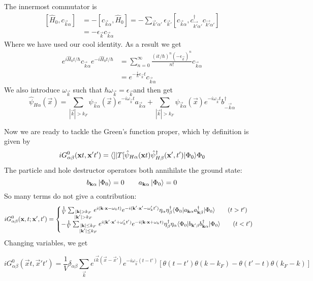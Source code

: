 The innermost commutator is
\begin{align*}
\left[\hat{H}_0, c_{\vec{k}\alpha}\right] &= -\left[c_{\vec{k}\alpha}, \hat{H}_0\right] = -\sum_{\vec{k}'\alpha'}\epsilon_{\vec{k}'}\left[c_{\vec{k}\alpha}, c^\dagger_{\vec{k'}\alpha'}c_{\vec{k'}\alpha'} \right] \\
&= -\epsilon_{\vec{k}}c_{\vec{k}\alpha}
\end{align*}
Where we have used our cool identity. As a result we get 
\begin{align*}
e^{i\hat{H}_0t / \hbar}c_{\vec{k}\alpha}e^{-i\hat{H}_0t / \hbar} &= \sum^\infty_{n=0}\frac{(it/\hbar)^n(-\epsilon_{\vec{k}})^n}{n!}c_{\vec{k}\alpha} \\
&= e^{- \frac{i}{\hbar}\epsilon_{\vec{k}}t}c_{\vec{k}\alpha}
\end{align*}
We also introduce $\omega_{\vec{k}}$ such that $\hbar \omega_{\vec{k}} = \epsilon_{\vec{k}}$and then get
\[ \hat{\psi}_{H\alpha}(\vec{x}) = \sum_{|\vec{k}|>k_F}\psi_{\vec{k}\alpha}(\vec{x})e^{-i\omega_{\vec{k}}t}a_{\vec{k}\alpha} + \sum_{|\vec{k}|> k_F}\psi_{\vec{k}\alpha}(\vec{x})e^{-i\omega_{\vec{k}}t}b^\dagger_{-\vec{k}\alpha} \]

Now we are ready to tackle the Green's function proper, which by definition is given by 
\[ iG_{\alpha\beta}^0(\vec{x}t, \vec{x}'t') = \braket[T[\hat{\psi}_{H\alpha}(\vec{x}t)\hat{\psi}_{H\beta}^\dagger(\vec{x}',t')]]{\Phi_0}{\Phi_0} \]
The particle and hole destructor operators both annihilate the ground state:
\[ b_{\bm{\mathrm{k}}\alpha} \left| \Phi_0 \right\rangle = 0 \qquad a_{\bm{\mathrm{k}}\alpha}\left| \Phi_0 \right\rangle = 0 \]
So many terms do not give a contribution:
\[ iG^0_{\alpha\beta}(\vec{x},t; \vec{x}', t') = \begin{cases}
\frac{1}{V} \sum_{\substack{|\vec{k}|>k_F \\ |\vec{k}'|> k_F}} e^{i(\vec{k}\cdot \vec{x} - \omega_k t)}e^{-i(\vec{k}'\cdot \vec{x}' - \omega_k't')}\eta_\alpha\eta_\beta^\dagger \braket[a_{\vec{k}\alpha}a^\dagger_{\vec{k}\beta}]{\Phi_0}{\Phi_0} \qquad (t>t') \\
-\frac{1}{V} \sum_{\substack{|\vec{k}|\leq k_F \\ |\vec{k}'|\leq k_F}} e^{i(\vec{k}'\cdot \vec{x}' + \omega_k't')}e^{-i(\vec{k}\cdot \vec{x} + \omega_k t)}\eta_\beta^\dagger\eta_\alpha \braket[b_{\vec{k}'\beta}b^\dagger_{\vec{k}\alpha}]{\Phi_0}{\Phi_0} \qquad (t<t')
\end{cases} \]
Changing variables, we get

\[iG^0_{\alpha\beta}(\vec{x}t, \vec{x}'t') = \frac{1}{V}\delta_{\alpha\beta} \sum_{\vec{k}} e^{i \vec{k}(\vec{x}- \vec{x}')}e^{-i\omega_{\vec{k}}(t-t')} \left[\theta(t-t')\theta(k-k_F) - \theta(t'-t)\theta(k_F-k)\right]\]

